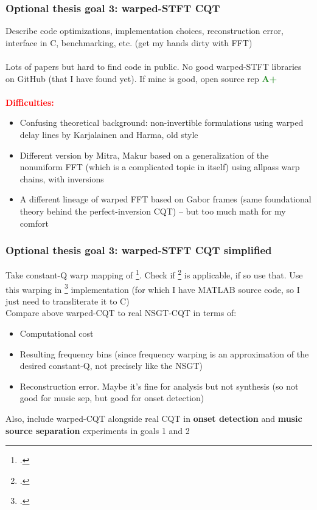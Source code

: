\documentclass[usenames,dvipsnames]{beamer}
\begin{document}
\begin{frame}
	\frametitle{Optional thesis goal 3: warped-STFT CQT}
	Describe code optimizations, implementation choices, reconstruction error, interface in C, benchmarking, etc. (get my hands dirty with FFT)\\\ \\
	Lots of papers but hard to find code in public. No good warped-STFT libraries on GitHub (that I have found yet). If mine is good, open source rep \textcolor{ForestGreen}{\textbf{A+}}\\\ \\
	\textcolor{red}{\textbf{Difficulties:}}
	\begin{itemize}
		\item
			Confusing theoretical background: non-invertible formulations using warped delay lines by Karjalainen and Harma, old style
		\item
			Different version by Mitra, Makur based on a generalization of the nonuniform FFT (which is a complicated topic in itself) using allpass warp chains, with inversions
		\item
			A different lineage of warped FFT based on Gabor frames (same foundational theory behind the perfect-inversion CQT) -- but too much math for my comfort
	\end{itemize}
\end{frame}

\begin{frame}
	\frametitle{Optional thesis goal 3: warped-STFT CQT simplified}
	Take constant-Q warp mapping of \footcite{cqwarp}. Check if \footcite{betterwarp} is applicable, if so use that. Use this warping in \footcite{makur2008} implementation (for which I have MATLAB source code, so I just need to transliterate it to C)\\
	Compare above warped-CQT to real NSGT-CQT in terms of:
	\begin{itemize}
		\item
			Computational cost
		\item
			Resulting frequency bins (since frequency warping is an approximation of the desired constant-Q, not precisely like the NSGT)
		\item
			Reconstruction error. Maybe it's fine for analysis but not synthesis (so not good for music sep, but good for onset detection)
	\end{itemize}

	Also, include warped-CQT alongside real CQT in \textbf{onset detection} and \textbf{music source separation} experiments in goals 1 and 2
\end{frame}
\end{document}
